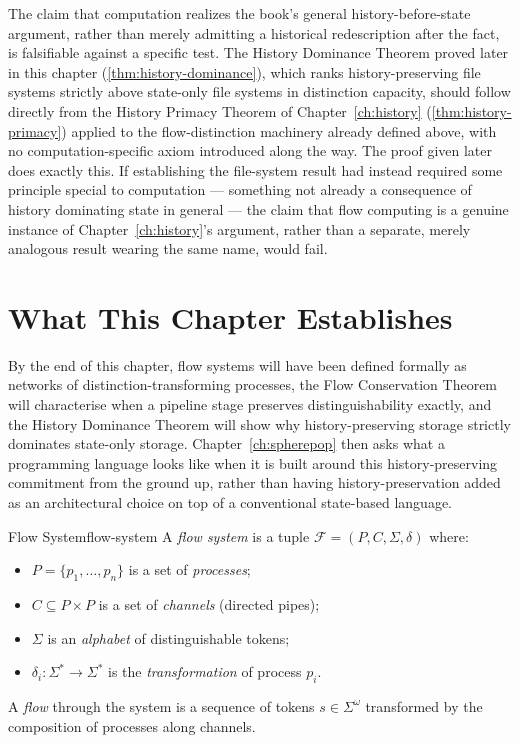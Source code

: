 \documentclass[12pt,twoside,openright]{book}
\begin{document}
The claim that computation realizes the book's general
history-before-state argument, rather than merely admitting a
historical redescription after the fact, is falsifiable
against a specific test. The History Dominance Theorem proved
later in this chapter (\cref{thm:history-dominance}), which
ranks history-preserving file systems strictly above
state-only file systems in distinction capacity, should follow
directly from the History Primacy Theorem of
Chapter~\ref{ch:history} (\cref{thm:history-primacy}) applied
to the flow-distinction machinery already defined above, with
no computation-specific axiom introduced along the way. The
proof given later does exactly this. If establishing the file-system
result had instead required some principle special to
computation --- something not already a consequence of history
dominating state in general --- the claim that flow computing
is a genuine instance of Chapter~\ref{ch:history}'s argument,
rather than a separate, merely analogous result wearing the
same name, would fail.

\section{What This Chapter Establishes}
\label{sec:ch23-preview}

By the end of this chapter, flow systems will have been
defined formally as networks of distinction-transforming
processes, the Flow Conservation Theorem will characterise
when a pipeline stage preserves distinguishability exactly,
and the History Dominance Theorem will show why
history-preserving storage strictly dominates state-only
storage. Chapter~\ref{ch:spherepop} then asks what a
programming language looks like when it is built around this
history-preserving commitment from the ground up, rather than
having history-preservation added as an architectural choice
on top of a conventional state-based language.

\begin{definition}{Flow System}{flow-system}
  A \emph{flow system} is a tuple
  $\mathcal{F} = (P, C, \Sigma, \delta)$ where:
  \begin{itemize}[nosep]
    \item $P = \{p_1, \ldots, p_n\}$ is a set of
          \emph{processes};
    \item $C \subseteq P \times P$ is a set of
          \emph{channels} (directed pipes);
    \item $\Sigma$ is an \emph{alphabet} of distinguishable
          tokens;
    \item $\delta_i : \Sigma^* \to \Sigma^*$ is the
          \emph{transformation} of process $p_i$.
  \end{itemize}
  A \emph{flow} through the system is a sequence of tokens
  $s \in \Sigma^\omega$ transformed by the composition of
  processes along channels.
\end{definition}
\end{document}
